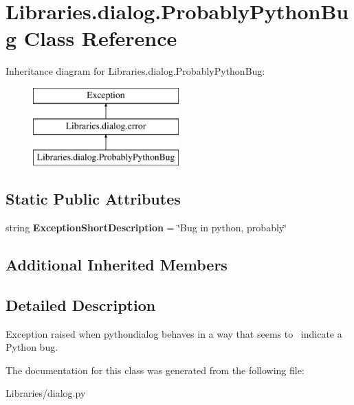 \hypertarget{class_libraries_1_1dialog_1_1_probably_python_bug}{}\section{Libraries.\+dialog.\+Probably\+Python\+Bug Class Reference}
\label{class_libraries_1_1dialog_1_1_probably_python_bug}
Inheritance diagram for Libraries.\+dialog.\+Probably\+Python\+Bug\+:\begin{figure}[H]
\begin{center}
\leavevmode
\includegraphics[height=3.000000cm]{class_libraries_1_1dialog_1_1_probably_python_bug}
\end{center}
\end{figure}
\subsection*{Static Public Attributes}
\begin{DoxyCompactItemize}
\item 
string {\bfseries Exception\+Short\+Description} = \char`\"{}Bug in python, probably\char`\"{}\hypertarget{class_libraries_1_1dialog_1_1_probably_python_bug_ac1f09c0256e7fbcf21def689c79e6019}{}\label{class_libraries_1_1dialog_1_1_probably_python_bug_ac1f09c0256e7fbcf21def689c79e6019}

\end{DoxyCompactItemize}
\subsection*{Additional Inherited Members}


\subsection{Detailed Description}
\begin{DoxyVerb}Exception raised when pythondialog behaves in a way that seems to \
indicate a Python bug.\end{DoxyVerb}
 

The documentation for this class was generated from the following file\+:\begin{DoxyCompactItemize}
\item 
Libraries/dialog.\+py\end{DoxyCompactItemize}
